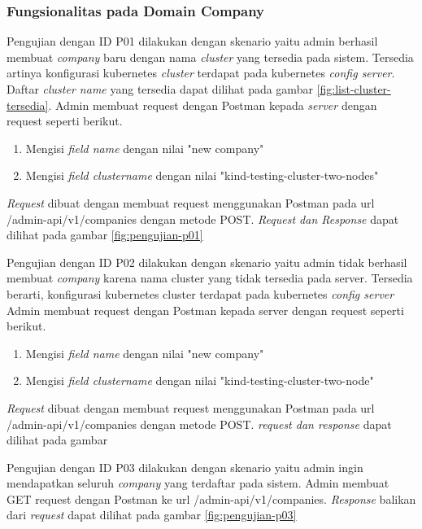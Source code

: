 \subsubsection{Fungsionalitas pada Domain Company}

Pengujian dengan ID P01 dilakukan dengan skenario yaitu admin berhasil membuat \textit{company} baru dengan nama \textit{cluster} yang tersedia pada sistem. Tersedia artinya konfigurasi kubernetes \textit{cluster} terdapat pada kubernetes \textit{config server}. Daftar \textit{cluster name} yang tersedia dapat dilihat pada gambar \ref{fig:list-cluster-tersedia}. Admin membuat request dengan Postman kepada \textit{server} dengan request seperti berikut.

\begin{enumerate}
  \item Mengisi \textit{field name} dengan nilai "new company"
  \item Mengisi \textit{field cluster\textunderscore name} dengan nilai "kind-testing-cluster-two-nodes"
\end{enumerate}

\textit{Request} dibuat dengan membuat request menggunakan Postman pada url /admin-api/v1/companies dengan metode POST. \textit{Request dan Response} dapat dilihat pada gambar \ref{fig:pengujian-p01}

Pengujian dengan ID P02 dilakukan dengan skenario yaitu admin tidak berhasil membuat \textit{company} karena nama cluster yang tidak tersedia pada server. Tersedia berarti, konfigurasi kubernetes cluster terdapat pada kubernetes \textit{config server} Admin membuat request dengan Postman kepada server dengan request seperti berikut.

\begin{enumerate}
  \item Mengisi \textit{field name} dengan nilai "new company"
  \item Mengisi \textit{field cluster\textunderscore name} dengan nilai "kind-testing-cluster-two-node"
\end{enumerate}

\textit{Request} dibuat dengan membuat request menggunakan Postman pada url /admin-api/v1/companies dengan metode POST. \textit{request dan response} dapat dilihat pada gambar


Pengujian dengan ID P03 dilakukan dengan skenario yaitu admin ingin mendapatkan seluruh \textit{company} yang terdaftar pada sistem. Admin membuat GET request dengan Postman ke url /admin-api/v1/companies. \textit{Response} balikan dari \textit{request} dapat dilihat pada gambar \ref{fig:pengujian-p03}

